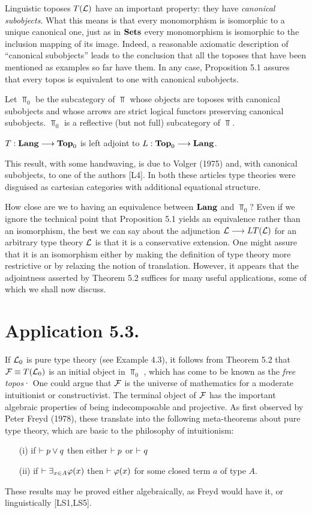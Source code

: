 Linguistic toposes $T({\mathcal L})$ have an important property: they have {\em canonical
subobjects}. What this means is that every monomorphism is isomorphic to a
unique canonical one, just as in ${\mathbf {Sets}}$ every monomorphism is isomorphic to
the inclusion mapping of its image. Indeed, a reasonable axiomatic
description of ``canonical subobjects'' leads to the conclusion that all the
toposes that have been mentioned as examples so far have them. In any case,
Proposition 5.1 assures that every topos is equivalent to one with canonical
subobjects.

Let $\Top_0$ be the subcategory of $\Top$ whose objects are toposes with
canonical subobjects and whose arrows are strict logical functors preserving
canonical subobjects. $\Top_0$ is a reflective (but not full) subcategory of
$\Top$.

\begin{thm}
$T: {\mathbf {Lang}} \longrightarrow {\mathbf {Top}}_0$ is left adjoint to $L: {\mathbf {Top}}_0 \longrightarrow {\mathbf {Lang}}$.
\end{thm}

This result, with some handwaving, is due to Volger (1975) and, with
canonical subobjects, to one of the authors [L4]. In both these articles type
theories were disguised as cartesian categories with additional equational
structure.

How close are we to having an equivalence between ${\mathbf {Lang}}$ and $\Top_0$? Even
if we ignore the technical point that Proposition 5.1 yields an equivalence
rather than an isomorphism, the best we can say about the adjunction
${\mathcal L} \longrightarrow LT({\mathcal L})$ for an arbitrary type theory ${\mathcal L}$ is that it is a conservative
extension. One might assure that it is an isomorphism either by making the
definition of type theory more restrictive or by relaxing the notion of
translation. However, it appears that the adjointness asserted by Theorem 5.2
suffices for many useful applications, some of which we shall now discuss.

\section*{Application 5.3.}

If ${\mathcal L}_0$ is pure type theory (see Example 4.3), it
follows from Theorem 5.2 that ${\mathcal F} \equiv T({\mathcal L}_0)$ is an initial object
in $\Top_0$ , which has come to be known as the {\em free topos}· 
One could argue that ${\mathcal F}$ is the universe of mathematics for a moderate
intuitionist or constructivist. The terminal object of ${\mathcal F}$ has the important 
algebraic properties of being indecomposable and projective. As first observed 
by Peter Freyd (1978), these translate into the following meta-theorems
about pure type theory, which are basic to the philosophy of intuitionism:
\begin{enumerate}
\item[(i)] if $\vdash p \vee q$ then either $\vdash p$ or $\vdash q$
\item[(ii)] if $\vdash \exists_{x\in A} \varphi(x)$ then $\vdash \varphi(x)$ 
for some closed term $a$ of type $A$.
\end{enumerate}
These results may be proved either algebraically, as Freyd would have it,
or linguistically [LS1,LS5].

